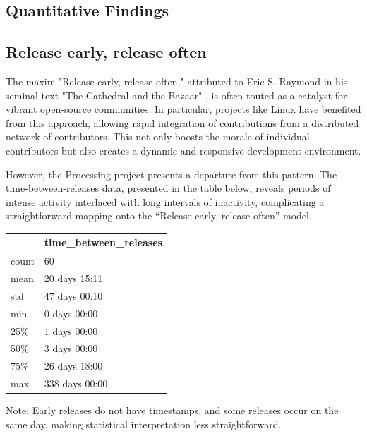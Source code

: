 
\subsection{Quantitative Findings}

\subsection{Release early, release often}

The maxim "Release early, release often," attributed to Eric S. Raymond in his seminal text "The Cathedral and the Bazaar" \parencite{raymondCathedralBazaar1999}, is often touted as a catalyst for vibrant open-source communities. In particular, projects like Linux have benefited from this approach, allowing rapid integration of contributions from a distributed network of contributors. This not only boosts the morale of individual contributors but also creates a dynamic and responsive development environment.

However, the Processing project presents a departure from this pattern. The time-between-releases data, presented in the table below, reveals periods of intense activity interlaced with long intervals of inactivity, complicating a straightforward mapping onto the “Release early, release often” model.

\begin{tabular}{ll}
  \toprule
   & time\_between\_releases \\
  \midrule
  count & 60 \\
  mean & 20 days 15:11 \\
  std & 47 days 00:10 \\
  min & 0 days 00:00 \\
  25\% & 1 days 00:00 \\
  50\% & 3 days 00:00 \\
  75\% & 26 days 18:00 \\
  max & 338 days 00:00 \\
  \bottomrule
\end{tabular}

Note: Early releases do not have timestamps, and some releases occur on the same day, making statistical interpretation less straightforward.

